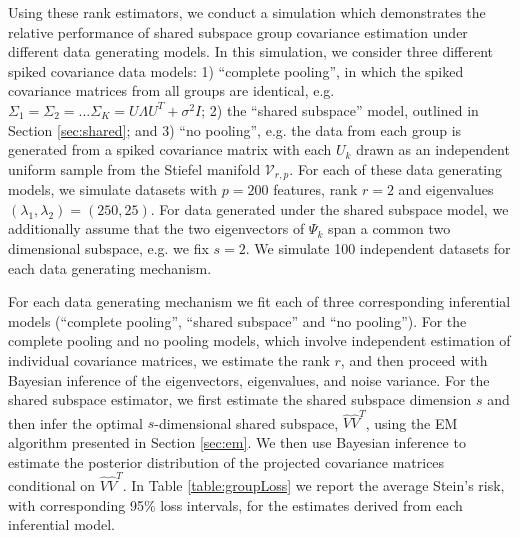 \documentclass[12pt]{article}
\begin{document}
Using these rank estimators, we conduct a simulation which demonstrates
the relative performance of shared subspace group covariance
estimation under different data generating models.  In this
simulation, we consider three different spiked covariance data models:
1) ``complete pooling'', in which the spiked covariance matrices from
all groups are identical, e.g.
$\Sigma_1 = \Sigma_2 = ... \Sigma_K = U\Lambda U^T + \sigma^2I$; 2)
the ``shared subspace'' model, outlined in Section \ref{sec:shared};
and 3) ``no pooling'', e.g. the data from each group is generated from
a spiked covariance matrix with each $U_k$ drawn as an independent
uniform sample from the Stiefel manifold $\mathcal{V}_{r, p}$.  For
each of these data generating models, we simulate datasets with
$p=200$ features, rank $r=2$ and eigenvalues
$(\lambda_1, \lambda_2) = (250, 25)$.  For data generated under the
shared subspace model, we additionally assume that the two
eigenvectors of $\Psi_k$ span a common two dimensional subspace, e.g. we fix
$s=2$.  We simulate 100 independent datasets for each data generating
mechanism.

For each data generating mechanism we fit each of three corresponding
inferential models (``complete pooling'', ``shared subspace'' and ``no
pooling''). For the complete pooling and no pooling models, which
involve independent estimation of individual covariance matrices, we
estimate the rank $r$, and then proceed with Bayesian inference of the
eigenvectors, eigenvalues, and noise variance.  For the shared
subspace estimator, we first estimate the shared subspace dimension
$s$ and then infer the optimal $s$-dimensional shared subspace,
$\hat{V}\hat{V}^T$, using the EM algorithm presented in Section
\ref{sec:em}.  We then use Bayesian inference to estimate the
posterior distribution of the projected covariance matrices
conditional on $\hat{V}\hat{V}^T$.  In Table \ref{table:groupLoss} we
report the average Stein's risk, with corresponding 95\% loss
intervals, for the estimates derived from each inferential model.
\end{document}
